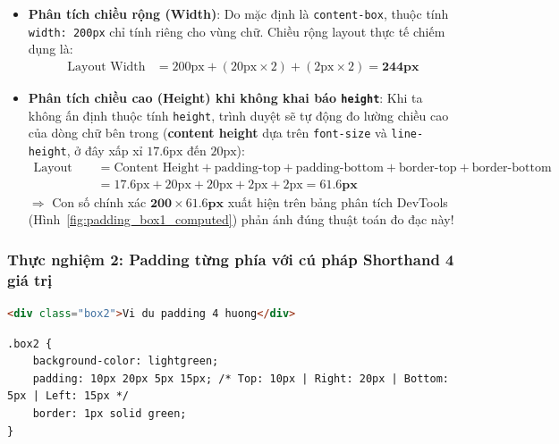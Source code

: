 \documentclass[11pt,oneside]{book}
\newcommand{\codeinline}[1]{\textcolor{accentOrange}{\texttt{#1}}}
\newcommand{\term}[1]{\textbf{\textcolor{primaryBlue}{#1}}}
\begin{document}
\begin{itemize}[leftmargin=1.5em, itemsep=3.5pt, parsep=0pt]
    \item \textbf{Phân tích chiều rộng (\term{Width})}:
    Do mặc định là \codeinline{content-box}, thuộc tính \codeinline{width: 200px} chỉ tính riêng cho vùng chữ. Chiều rộng layout thực tế chiếm dụng là:
    \begin{align*}
    \text{Layout Width} &= 200\text{px} + (20\text{px} \times 2) + (2\text{px} \times 2) = \mathbf{244\text{px}}
    \end{align*}
    \item \textbf{Phân tích chiều cao (\term{Height}) khi không khai báo \codeinline{height}}:
    Khi ta không ấn định thuộc tính \codeinline{height}, trình duyệt sẽ tự động đo lường chiều cao của dòng chữ bên trong (\term{content height} dựa trên \codeinline{font-size} và \codeinline{line-height}, ở đây xấp xỉ $17.6\text{px}$ đến $20\text{px}$):
    \begin{align*}
    \text{Layout Height} &= \text{Content Height} + \text{padding-top} + \text{padding-bottom} + \text{border-top} + \text{border-bottom} \\
    &= 17.6\text{px} + 20\text{px} + 20\text{px} + 2\text{px} + 2\text{px} = \mathbf{61.6\text{px}}
    \end{align*}
    $\Longrightarrow$ Con số chính xác $\mathbf{200 \times 61.6\text{px}}$ xuất hiện trên bảng phân tích DevTools (Hình~\ref{fig:padding_box1_computed}) phản ánh đúng thuật toán đo đạc này!
\end{itemize}

\subsubsection{Thực nghiệm 2: Padding từng phía với cú pháp Shorthand 4 giá trị}

\begin{codeWindow}
\begin{lstlisting}[language=HTML]
<div class="box2">Vi du padding 4 huong</div>
\end{lstlisting}
\begin{lstlisting}[language=CSS3]
.box2 {
    background-color: lightgreen;
    padding: 10px 20px 5px 15px; /* Top: 10px | Right: 20px | Bottom: 5px | Left: 15px */
    border: 1px solid green;
}
\end{lstlisting}
\end{codeWindow}
\end{document}
